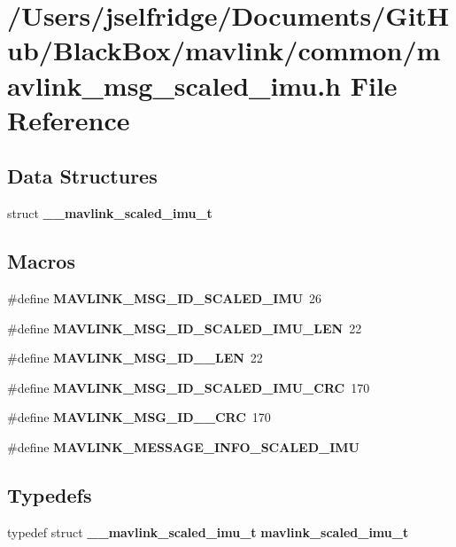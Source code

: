 \section{/\+Users/jselfridge/\+Documents/\+Git\+Hub/\+Black\+Box/mavlink/common/mavlink\+\_\+msg\+\_\+scaled\+\_\+imu.h File Reference}
\label{mavlink__msg__scaled__imu_8h}
\subsection*{Data Structures}
\begin{DoxyCompactItemize}
\item 
struct \textbf{ \+\_\+\+\_\+mavlink\+\_\+scaled\+\_\+imu\+\_\+t}
\end{DoxyCompactItemize}
\subsection*{Macros}
\begin{DoxyCompactItemize}
\item 
\#define \textbf{ M\+A\+V\+L\+I\+N\+K\+\_\+\+M\+S\+G\+\_\+\+I\+D\+\_\+\+S\+C\+A\+L\+E\+D\+\_\+\+I\+MU}~26
\item 
\#define \textbf{ M\+A\+V\+L\+I\+N\+K\+\_\+\+M\+S\+G\+\_\+\+I\+D\+\_\+\+S\+C\+A\+L\+E\+D\+\_\+\+I\+M\+U\+\_\+\+L\+EN}~22
\item 
\#define \textbf{ M\+A\+V\+L\+I\+N\+K\+\_\+\+M\+S\+G\+\_\+\+I\+D\+\_\+\_\+\+L\+EN}~22
\item 
\#define \textbf{ M\+A\+V\+L\+I\+N\+K\+\_\+\+M\+S\+G\+\_\+\+I\+D\+\_\+\+S\+C\+A\+L\+E\+D\+\_\+\+I\+M\+U\+\_\+\+C\+RC}~170
\item 
\#define \textbf{ M\+A\+V\+L\+I\+N\+K\+\_\+\+M\+S\+G\+\_\+\+I\+D\+\_\+\_\+\+C\+RC}~170
\item 
\#define \textbf{ M\+A\+V\+L\+I\+N\+K\+\_\+\+M\+E\+S\+S\+A\+G\+E\+\_\+\+I\+N\+F\+O\+\_\+\+S\+C\+A\+L\+E\+D\+\_\+\+I\+MU}
\end{DoxyCompactItemize}
\subsection*{Typedefs}
\begin{DoxyCompactItemize}
\item 
typedef struct \textbf{ \+\_\+\+\_\+mavlink\+\_\+scaled\+\_\+imu\+\_\+t} \textbf{ mavlink\+\_\+scaled\+\_\+imu\+\_\+t}
\end{DoxyCompactItemize}


